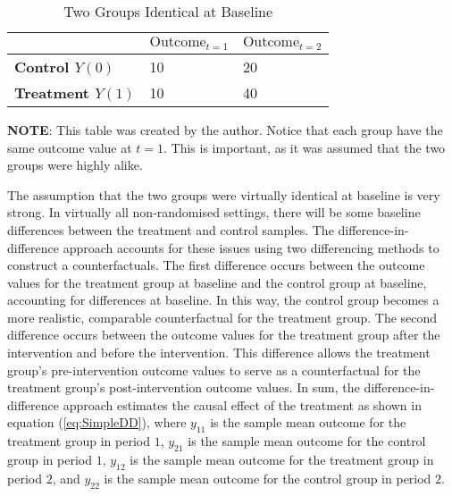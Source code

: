 \documentclass[12pt]{article}
\begin{document}
\begin{table}
  \caption{Two Groups Identical at Baseline}
  \begin{center}
      \begin{threeparttable}
        \begin{tabularx}{\textwidth}{|X|X|X|}
          \hline
           & \textbf{$\textrm{Outcome}_{t=1}$} & \textbf{$\textrm{Outcome}_{t=2}$} \\
          \hline
          \textbf{Control $Y(0)$} & 10 & 20 \\
          \hline
          \textbf{Treatment $Y(1)$} & 10 & 40 \\
          \hline
        \end{tabularx}
        \begin{tablenotes}
          \footnotesize
          \textbf{NOTE}: This table was created by the author. Notice that each group have the same outcome value at $t=1$. This is important, as it was assumed that the two groups were highly alike.
        \end{tablenotes}
      \end{threeparttable}
  \end{center}
\label{tab:BasicDD}
\end{table}

The assumption that the two groups were virtually identical at baseline is very strong. In virtually all non-randomised settings, there will be some baseline differences between the treatment and control samples. The difference-in-difference approach accounts for these issues using two differencing methods to construct a counterfactuals. The first difference occurs between the outcome values for the treatment group at baseline and the control group at baseline, accounting for differences at baseline. In this way, the control group becomes a more realistic, comparable counterfactual for the treatment group. The second difference occurs between the outcome values for the treatment group after the intervention and before the intervention. This difference allows the treatment group's pre-intervention outcome values to serve as a counterfactual for the treatment group's post-intervention outcome values. In sum, the difference-in-difference approach estimates the causal effect of the treatment as shown in equation (\ref{eq:SimpleDD}), where $y_{11}$ is the sample mean outcome for the treatment group in period $1$, $y_{21}$ is the sample mean outcome for the control group in period $1$, $y_{12}$ is the sample mean outcome for the treatment group in period $2$, and $y_{22}$ is the sample mean outcome for the control group in period $2$.
\end{document}
